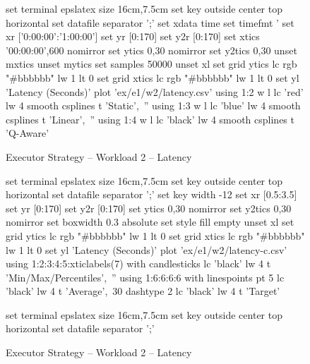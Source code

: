 \begin{figure}[!htbp]
	\centering
	\begin{minipage}[h]{\linewidth}
		\centering
		\begin{gnuplot}[terminal=epslatex, terminaloptions=color colortext]
			set terminal epslatex size 16cm,7.5cm
			set key outside center top horizontal
			set datafile separator ';'
			set xdata time
			set timefmt '%
			set xr ['0:00:00':'1:00:00']
			set yr [0:170]
			set y2r [0:170]
			set xtics '00:00:00',600 nomirror
			set ytics 0,30 nomirror
			set y2tics 0,30
			unset mxtics
			unset mytics
			set samples 50000 
			unset xl
            set grid ytics lc rgb "#bbbbbb" lw 1 lt 0
            set grid xtics lc rgb "#bbbbbb" lw 1 lt 0
			set yl 'Latency (Seconds)'
			plot 'ex/e1/w2/latency.csv' using 1:2 w l lc 'red' lw 4 smooth csplines t 'Static',\
			'' using 1:3 w l lc 'blue' lw 4 smooth csplines t 'Linear',\
			'' using 1:4 w l lc 'black' lw 4 smooth csplines t 'Q-Aware'
		\end{gnuplot}
		\caption{Executor Strategy -- Workload 2 -- Latency}
		\label{eval:f:e1:w2:lat}
	\end{minipage}\hfil
	\begin{minipage}[h]{\linewidth}
		\centering
		\begin{gnuplot}[terminal=epslatex, terminaloptions=color colortext]
			set terminal epslatex size 16cm,7.5cm
			set key outside center top horizontal
			set datafile separator ';'
            set key width -12
			set xr [0.5:3.5]
			set yr [0:170]
			set y2r [0:170]
			set ytics 0,30 nomirror
			set y2tics 0,30 nomirror
			set boxwidth 0.3 absolute
			set style fill empty
			unset xl
            set grid ytics lc rgb "#bbbbbb" lw 1 lt 0
            set grid xtics lc rgb "#bbbbbb" lw 1 lt 0
			set yl 'Latency (Seconds)'
			plot 'ex/e1/w2/latency-c.csv' using 1:2:3:4:5:xticlabels(7) with candlesticks lc 'black' lw 4 t 'Min/Max/Percentiles',\
			'' using 1:6:6:6:6 with linespoints pt 5 lc 'black' lw 4 t 'Average',\
            30 dashtype 2 lc 'black' lw 4 t 'Target'
		\end{gnuplot}
		\caption{Executor Strategy -- Workload 2 -- Latency}
		\label{eval:f:e1:w2:lat-c}
	\end{minipage}\hfil
	\begin{minipage}[h]{\linewidth}
		\centering
		\begin{gnuplot}[terminal=epslatex, terminaloptions=color colortext]
			set terminal epslatex size 16cm,7.5cm
			set key outside center top horizontal
			set datafile separator ';'

\end{gnuplot}
\end{minipage}
\end{figure}
